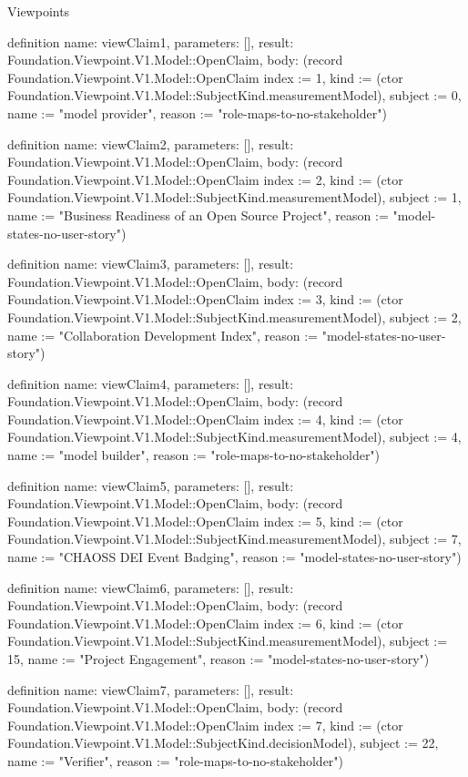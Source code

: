 \begin{lexlean}{Viewpoints}
\begin{semanticmodule}
definition{
  name: viewClaim1,
  parameters: [],
  result: Foundation.Viewpoint.V1.Model::OpenClaim,
  body: (record Foundation.Viewpoint.V1.Model::OpenClaim {index := 1, kind := (ctor Foundation.Viewpoint.V1.Model::SubjectKind.measurementModel), subject := 0, name := "model provider", reason := "role-maps-to-no-stakeholder"})
}

definition{
  name: viewClaim2,
  parameters: [],
  result: Foundation.Viewpoint.V1.Model::OpenClaim,
  body: (record Foundation.Viewpoint.V1.Model::OpenClaim {index := 2, kind := (ctor Foundation.Viewpoint.V1.Model::SubjectKind.measurementModel), subject := 1, name := "Business Readiness of an Open Source Project", reason := "model-states-no-user-story"})
}

definition{
  name: viewClaim3,
  parameters: [],
  result: Foundation.Viewpoint.V1.Model::OpenClaim,
  body: (record Foundation.Viewpoint.V1.Model::OpenClaim {index := 3, kind := (ctor Foundation.Viewpoint.V1.Model::SubjectKind.measurementModel), subject := 2, name := "Collaboration Development Index", reason := "model-states-no-user-story"})
}

definition{
  name: viewClaim4,
  parameters: [],
  result: Foundation.Viewpoint.V1.Model::OpenClaim,
  body: (record Foundation.Viewpoint.V1.Model::OpenClaim {index := 4, kind := (ctor Foundation.Viewpoint.V1.Model::SubjectKind.measurementModel), subject := 4, name := "model builder", reason := "role-maps-to-no-stakeholder"})
}

definition{
  name: viewClaim5,
  parameters: [],
  result: Foundation.Viewpoint.V1.Model::OpenClaim,
  body: (record Foundation.Viewpoint.V1.Model::OpenClaim {index := 5, kind := (ctor Foundation.Viewpoint.V1.Model::SubjectKind.measurementModel), subject := 7, name := "CHAOSS DEI Event Badging", reason := "model-states-no-user-story"})
}

definition{
  name: viewClaim6,
  parameters: [],
  result: Foundation.Viewpoint.V1.Model::OpenClaim,
  body: (record Foundation.Viewpoint.V1.Model::OpenClaim {index := 6, kind := (ctor Foundation.Viewpoint.V1.Model::SubjectKind.measurementModel), subject := 15, name := "Project Engagement", reason := "model-states-no-user-story"})
}

definition{
  name: viewClaim7,
  parameters: [],
  result: Foundation.Viewpoint.V1.Model::OpenClaim,
  body: (record Foundation.Viewpoint.V1.Model::OpenClaim {index := 7, kind := (ctor Foundation.Viewpoint.V1.Model::SubjectKind.decisionModel), subject := 22, name := "Verifier", reason := "role-maps-to-no-stakeholder"})
}


\end{semanticmodule}
\end{lexlean}
